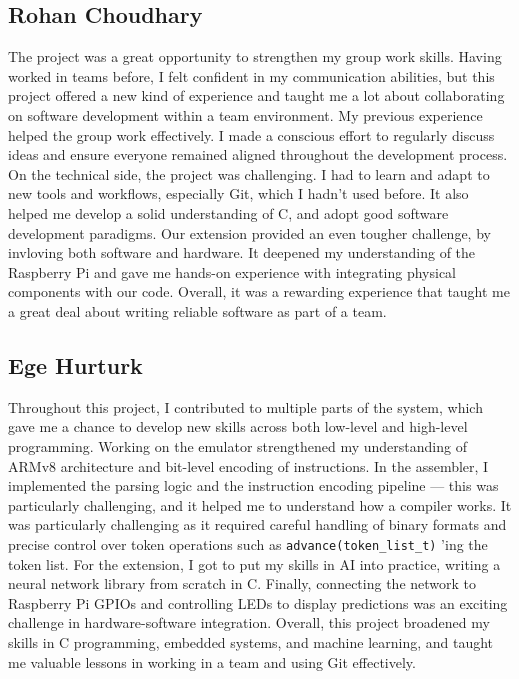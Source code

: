 \documentclass{article}
\begin{document}
\subsection{Rohan Choudhary}
The project was a great opportunity to strengthen my group work skills. Having worked in teams before, I felt confident in my communication abilities, but this project offered a new kind of experience and taught me a lot about collaborating on software development within a team environment. My previous experience helped the group work effectively. I made a conscious effort to regularly discuss ideas and ensure everyone remained aligned throughout the development process. On the technical side, the project was challenging. I had to learn and adapt to new tools and workflows, especially Git, which I hadn’t used before. It also helped me develop a solid understanding of C, and adopt good software development paradigms. Our extension provided an even tougher challenge, by invloving both software and hardware. It deepened my understanding of the Raspberry Pi and gave me hands-on experience with integrating physical components with our code. Overall, it was a rewarding experience that taught me a great deal about writing reliable software as part of a team.

\subsection{Ege Hurturk}
Throughout this project, I contributed to multiple parts of the system, which gave me a chance to develop new skills across both low-level and high-level programming. Working on the emulator strengthened my understanding of ARMv8 architecture and bit-level encoding of instructions. In the assembler, I implemented the parsing logic and the instruction encoding pipeline — this was particularly challenging, and it helped me to understand how a compiler works. It was particularly challenging as it required careful handling of binary formats and precise control over token operations such as \texttt{advance(token\_list\_t)} 'ing the token list.  For the extension, I got to put my skills in AI into practice, writing a neural network library from scratch in C. Finally, connecting the network to Raspberry Pi GPIOs and controlling LEDs to display predictions was an exciting challenge in hardware-software integration. Overall, this project broadened my skills in C programming, embedded systems, and machine learning, and taught me valuable lessons in working in a team and using Git effectively.
\end{document}
